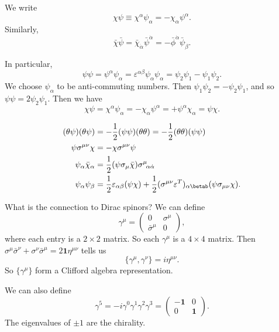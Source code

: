 \documentclass[a4paper]{article}
\begin{document}
\begin{notation}
  We write
  \[
    \chi\psi \equiv \chi^\alpha \psi_\alpha = - \chi_\alpha \psi^\alpha.
  \]
  Similarly,
  \[
    \bar{\chi} \bar{\psi} = \bar{\chi}_{\dot{\alpha}} \bar\psi^{\dot{\alpha}} = - \bar{\phi}^{\dot{\alpha}} \bar{\psi}_{\dot{\beta}}.
  \]
\end{notation}
In particular,
\[
  \psi\psi = \psi^\alpha \psi_\alpha = \varepsilon^{\alpha\beta} \psi_\alpha \psi_\alpha = \psi_2 \psi_1 - \psi_1 \psi_2.
\]
We choose $\psi_\alpha$ to be anti-commuting numbers. Then $\psi_1 \psi_2 = - \psi_2 \psi_1$, and so $\psi \psi = 2 \psi_2 \psi_1$. Then we have
\[
  \chi \psi = \chi^\alpha \psi_\alpha = - \chi_\alpha \psi^\alpha = + \psi^\alpha \chi_\alpha = \psi \chi.
\]
\begin{prop}
  \begin{align*}
    (\theta \psi) (\theta \psi) &= - \frac{1}{2} (\psi \psi) (\theta \theta) = - \frac{1}{2} (\theta \theta)(\psi \psi)\\
    \psi \sigma^{\mu\nu} \chi &= - \chi \sigma^{\mu\nu} \psi\\
    \psi_\alpha \bar{\chi}_\alpha &= \frac{1}{2} (\psi \sigma_\mu \bar{\chi}) \sigma^\mu\!_{\alpha \dot{\alpha}}\\
    \psi_\alpha \psi_\beta &= \frac{1}{2} \varepsilon_{\alpha\beta} (\psi \chi) + \frac{1}{2} (\sigma^{\mu\nu} \varepsilon^T)_{\alpha\betab} (\psi \sigma_{\mu\nu} \chi).
  \end{align*}
\end{prop}

What is the connection to Dirac spinors? We can define
\[
  \gamma^\mu =
  \begin{pmatrix}
    0 & \sigma^\mu\\
    \bar{\sigma}^\mu & 0
  \end{pmatrix},
\]
where each entry is a $2 \times 2$ matrix. So each $\gamma^\mu$ is a $4 \times 4$ matrix. Then $\sigma^\mu \bar{\sigma}^\nu + \sigma^\nu \bar{\sigma}^\mu = 2\mathbf{1}\eta^{\mu\nu}$ tells us
\[
  \{\gamma^\mu, \gamma^\nu\} = i \eta^{\mu\nu}.
\]
So $\{\gamma^\mu\}$ form a Clifford algebra representation.

We can also define
\[
  \gamma^5 = -i \gamma^0 \gamma^1 \gamma^2 \gamma^3 =
  \begin{pmatrix}
    -\mathbf{1} & 0\\
    0 & \mathbf{1}
  \end{pmatrix}.
\]
The eigenvalues of $\pm 1$ are the chirality.
\end{document}
